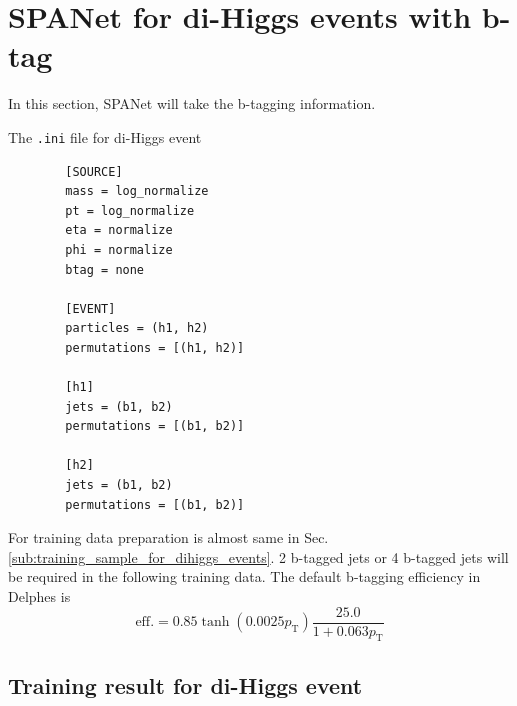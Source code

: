 \documentclass[12pt]{article}
\begin{document}

\section{SPANet for di-Higgs events with b-tag}%
\label{sec:spanet_for_di_higgs_events_with_b_tag}
	In this section, SPANet will take the b-tagging information.

	The \verb+.ini+ file for di-Higgs event
	\begin{verbatim}
		[SOURCE]
		mass = log_normalize
		pt = log_normalize
		eta = normalize
		phi = normalize
		btag = none

		[EVENT]
		particles = (h1, h2)
		permutations = [(h1, h2)]

		[h1]
		jets = (b1, b2)
		permutations = [(b1, b2)]

		[h2]
		jets = (b1, b2)
		permutations = [(b1, b2)]			
	\end{verbatim}

	For training data preparation is almost same in Sec.\ref{sub:training_sample_for_dihiggs_events}. 2 b-tagged jets or 4 b-tagged jets will be required in the following training data. The default b-tagging efficiency in Delphes is 
	\begin{equation}
		\text{eff.} = 0.85 \tanh(0.0025p_\text{T}) \frac{25.0}{1+0.063p_\text{T}}		
	\end{equation}

	\subsection{Training result for di-Higgs event}%
	\label{sub:training_result_for_di_higgs_event_b}
\end{document}

